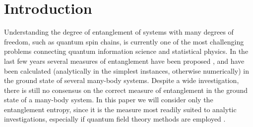 \newpage





\section{Introduction}


Understanding the degree of entanglement of systems with many degrees 
of freedom, such as quantum spin chains, is currently one of the 
most challenging 
problems connecting quantum information science and statistical physics.
In the last few years several measures of entanglement have been 
proposed \cite{meas,Vidal}, and have been 
calculated (analytically in the simplest
instances, otherwise numerically) in the ground state of several
many-body systems. 
Despite a wide investigation, there is still no consensus 
on the correct measure of entanglement in the ground state of a many-body 
system. In this paper we will consider only the entanglement entropy,
since it is the measure most readily suited to analytic 
investigations, especially if quantum field theory methods 
are employed \cite{cc-04}.

